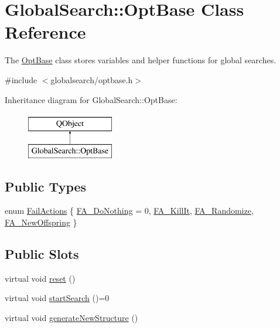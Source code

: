 \hypertarget{classGlobalSearch_1_1OptBase}{}\section{Global\+Search\+:\+:Opt\+Base Class Reference}
\label{classGlobalSearch_1_1OptBase}


The \hyperlink{classGlobalSearch_1_1OptBase}{Opt\+Base} class stores variables and helper functions for global searches.  




{\ttfamily \#include $<$globalsearch/optbase.\+h$>$}

Inheritance diagram for Global\+Search\+:\+:Opt\+Base\+:\begin{figure}[H]
\begin{center}
\leavevmode
\includegraphics[height=2.000000cm]{classGlobalSearch_1_1OptBase}
\end{center}
\end{figure}
\subsection*{Public Types}
\begin{DoxyCompactItemize}
\item 
enum \hyperlink{classGlobalSearch_1_1OptBase_a970b328cd0a36335c34c6b24c6ac2775}{Fail\+Actions} \{ \hyperlink{classGlobalSearch_1_1OptBase_a970b328cd0a36335c34c6b24c6ac2775ab04d2d04ae7df7ba1da75a185c53dfca}{F\+A\+\_\+\+Do\+Nothing} = 0, 
\hyperlink{classGlobalSearch_1_1OptBase_a970b328cd0a36335c34c6b24c6ac2775a4457ab4b5903c890b0edf0817bf00e74}{F\+A\+\_\+\+Kill\+It}, 
\hyperlink{classGlobalSearch_1_1OptBase_a970b328cd0a36335c34c6b24c6ac2775a79cd7097c06d1b27824ae7c90201276a}{F\+A\+\_\+\+Randomize}, 
\hyperlink{classGlobalSearch_1_1OptBase_a970b328cd0a36335c34c6b24c6ac2775a548d59265329ca034e4e99257b85aa5e}{F\+A\+\_\+\+New\+Offspring}
 \}
\end{DoxyCompactItemize}
\subsection*{Public Slots}
\begin{DoxyCompactItemize}
\item 
virtual void \hyperlink{classGlobalSearch_1_1OptBase_aeb13548fad4b090a7e570011292fd389}{reset} ()
\item 
virtual void \hyperlink{classGlobalSearch_1_1OptBase_adc0d183586cb9433edc941ccea4cd1a4}{start\+Search} ()=0
\item 
virtual void \hyperlink{classGlobalSearch_1_1OptBase_a24b6e929232e6b82551c3917bf7dcc1c}{generate\+New\+Structure} ()
\end{DoxyCompactItemize}
